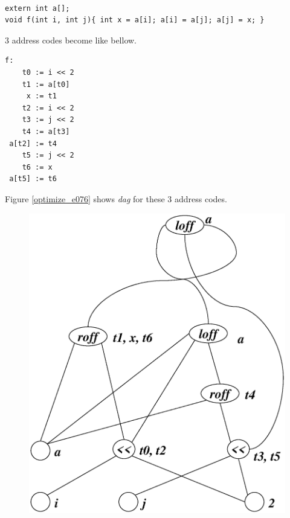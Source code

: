 \begin{Example}
\label{optimize_e075}
\begin{verbatim}

extern int a[];
void f(int i, int j){ int x = a[i]; a[i] = a[j]; a[j] =	x; }
\end{verbatim}
3 address codes become like bellow.
\begin{verbatim}
f:
    t0 := i << 2
    t1 := a[t0]
     x := t1
    t2 := i << 2
    t3 := j << 2
    t4 := a[t3]
 a[t2] := t4
    t5 := j << 2
    t6 := x
 a[t5] := t6
\end{verbatim}
Figure \ref{optimize_e076} shows {\em dag} for these 3 address codes.
\begin{figure}[htbp]
\begin{center}
\includegraphics[width=1.0\linewidth,height=1.4\linewidth]{opt031.eps}

\end{center}
\end{figure}
\end{Example}
